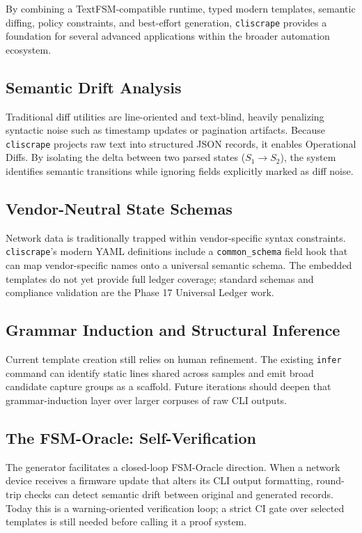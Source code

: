 \documentclass[a4paper,10pt]{article}
\begin{document}
By combining a TextFSM-compatible runtime, typed modern templates, semantic diffing, policy constraints, and best-effort generation, \texttt{cliscrape} provides a foundation for several advanced applications within the broader automation ecosystem.

\subsection{Semantic Drift Analysis}
Traditional diff utilities are line-oriented and text-blind, heavily penalizing syntactic noise such as timestamp updates or pagination artifacts. Because \texttt{cliscrape} projects raw text into structured \ac{JSON} records, it enables Operational Diffs. By isolating the delta between two parsed states ($S_1 \rightarrow S_2$), the system identifies semantic transitions while ignoring fields explicitly marked as diff noise.

\subsection{Vendor-Neutral State Schemas}
Network data is traditionally trapped within vendor-specific syntax constraints. \texttt{cliscrape}'s modern YAML definitions include a \texttt{common\_schema} field hook that can map vendor-specific names onto a universal semantic schema. The embedded templates do not yet provide full ledger coverage; standard schemas and compliance validation are the Phase 17 Universal Ledger work.

\subsection{Grammar Induction and Structural Inference}
Current template creation still relies on human refinement. The existing \texttt{infer} command can identify static lines shared across samples and emit broad candidate capture groups as a scaffold. Future iterations should deepen that grammar-induction layer over larger corpuses of raw CLI outputs.

\subsection{The FSM-Oracle: Self-Verification}
The generator facilitates a closed-loop FSM-Oracle direction. When a network device receives a firmware update that alters its CLI output formatting, round-trip checks can detect semantic drift between original and generated records. Today this is a warning-oriented verification loop; a strict CI gate over selected templates is still needed before calling it a proof system.
\end{document}
